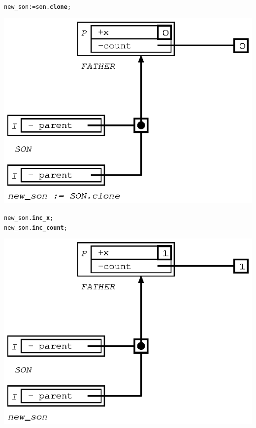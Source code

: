 \documentclass[11pt]{mybook}
\begin{document}
\begin{alltt}
  new\_son := {\sc{}son}.{\bf{}clone};
\end{alltt}
\begin{center}
\includegraphics[scale=1.0]{figures/inherit_minus_1} 
\end{center}

\begin{alltt}
  new\_son.{\bf{}inc\_x};
  new\_son.{\bf{}inc\_count};
\end{alltt}
\begin{center}
\includegraphics[scale=1.0]{figures/inherit_minus_2} 
\end{center}
\end{document}
